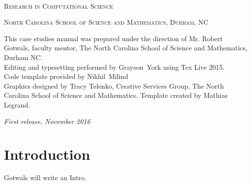 \documentclass[11pt]{book} %
\begin{document}

\newpage
~\vfill
\thispagestyle{empty}

\noindent \textsc{Research in Computational Science}\medskip

\noindent \textsc{North Carolina School of Science and Mathematics, Durham, NC}\medskip %

\noindent This case studies manual was prepared under the direction of Mr. Robert Gotwals, faculty mentor, The North Carolina School of Science and Mathematics, Durham NC.\\
Editing and typesetting performed by Grayson~York using Tex Live 2015. \\
Code template provided by Nikhil~Milind\\
Graphics designed by Tracy Telenko, Creative Services Group, The North Carolina School of Science and Mathematics.
Template created by Mathias Legrand.\medskip   %

\noindent \textit{First release, November 2016} %

\pagestyle{empty} %
\tableofcontents %


\pagestyle{fancy} %


\chapter*{Introduction}
\vspace{1cm}

Gotwals will write an Intro.







\end{document}
